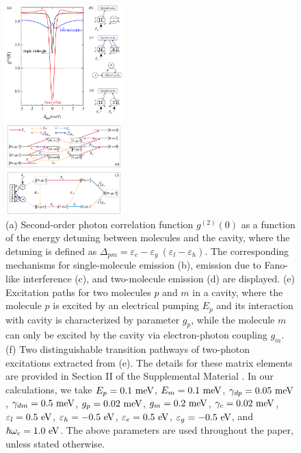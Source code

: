 \documentclass[aps,prb,
superscriptaddress,
,twocolumn
,floatfix,footinbib,longbibliography,
]{revtex4-2}
\begin{document}
\begin{figure}[h]
\centering
\includegraphics[width=0.4\textwidth]{fano-compare-mix.pdf}
\caption{(a) Second-order photon correlation function $g^{(2)}(0)$ as a function of the energy detuning between molecules and the cavity, where the detuning is defined as $\Delta_{pm}=\varepsilon_{e}-\varepsilon_{g}~(\varepsilon_{l}-\varepsilon_{h})$.
The corresponding mechanisms for single-molecule emission (b), emission due to Fano-like interference (c), and two-molecule emission (d) are displayed. 
(e) Excitation paths for two molecules $p$ and $m$ in a cavity, where the molecule $p$ is excited by an electrical pumping $E_{p}$ and its interaction with cavity is characterized by parameter $g_{p}$, while the molecule $m$ can only be excited by the cavity via electron-photon coupling $g_{m}$. (f) Two distinguishable transition pathways of two-photon excitations extracted from (e). The details for these matrix elements are provided in Section II of the Supplemental Material \cite{SupplementalMaterial}. In our calculations,
we take $E_{p}=0.1~{\rm meV}$, $E_{m}=0.1~{\rm meV}$, $\gamma_{dp}=0.05~{\rm meV}$, $\gamma_{dm}=0.5~{\rm meV}$, $g_{p}=0.02~{\rm meV}$, $g_{m}=0.2~{\rm meV}$, $\gamma_{c}=0.02~{\rm meV}$, $\varepsilon_{l}=0.5~{\rm eV}$, $\varepsilon_{h}=-0.5~{\rm eV}$, $\varepsilon_{e}=0.5~{\rm eV}$, $\varepsilon_{g}=-0.5~{\rm eV}$, and $\hbar\omega_{c}=1.0~{\rm eV}$.
The above parameters are used throughout the paper, unless stated otherwise.}
\label{fano-compare}
\end{figure}
\end{document}
